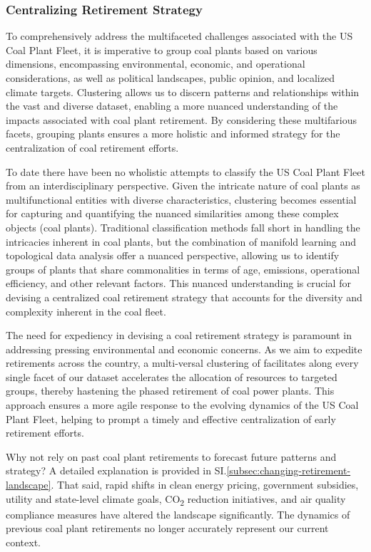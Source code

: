 \subsubsection*{Centralizing Retirement Strategy}


To comprehensively address the multifaceted challenges associated with the US Coal Plant Fleet, it is imperative to group coal plants based on various dimensions, 
encompassing environmental, economic, and operational considerations, as well as political landscapes, public opinion, and localized climate targets. Clustering allows us to discern patterns and relationships within the vast and diverse dataset, 
enabling a more nuanced understanding of the impacts associated with coal plant retirement. By considering these multifarious facets, grouping plants ensures a more 
holistic and informed strategy for the centralization of coal retirement efforts.

To date there have been no wholistic attempts to classify the US Coal Plant Fleet from an interdisciplinary perspective. Given the intricate nature of coal 
plants as multifunctional entities with diverse characteristics, clustering becomes essential for capturing and quantifying the nuanced similarities among these 
complex objects (coal plants). Traditional classification methods fall short in handling the intricacies inherent in coal plants, but the combination of manifold learning and topological data analysis offer 
a nuanced perspective, allowing us to identify groups of plants that share commonalities in terms of age, emissions, operational efficiency, and other relevant factors. 
This nuanced understanding is crucial for devising a centralized coal retirement strategy that accounts for the diversity and complexity inherent in the coal fleet.

The need for expediency in devising a coal retirement strategy is paramount in addressing pressing environmental and economic concerns. As we aim to expedite retirements across the country, 
a multi-versal clustering of facilitates along every single facet of our dataset accelerates the allocation of resources to targeted groups, thereby hastening the phased retirement of 
coal power plants. This approach ensures a more agile response to the evolving dynamics of the US Coal Plant Fleet, helping to prompt a timely and effective centralization of early retirement efforts.

Why not rely on past coal plant retirements to forecast future patterns and strategy? A detailed explanation is provided in SI.\ref{subsec:changing-retirement-landscape}. 
That said, rapid shifts in clean energy pricing, government subsidies, utility and state-level climate goals, CO\textsubscript{2} reduction initiatives, and air quality 
compliance measures have altered the landscape significantly. The dynamics of previous coal plant retirements no longer accurately represent our current context.

